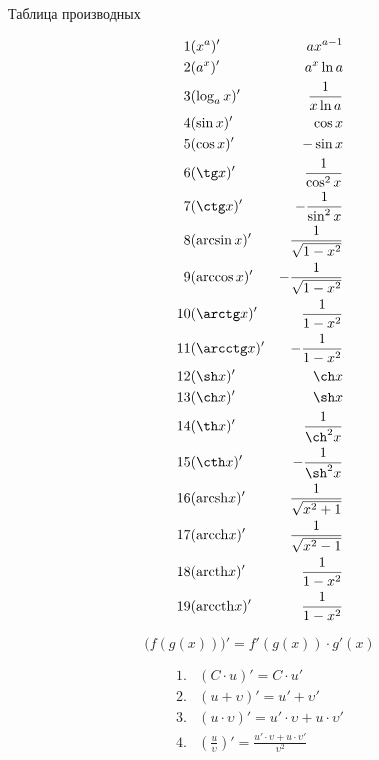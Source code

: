 \documentclass{article}
\newcommand{\arcsh}{\mathrm{arcsh}}
\newcommand{\arcch}{\mathrm{arcch}}
\newcommand{\arcth}{\mathrm{arcth}}
\newcommand{\arccth}{\mathrm{arccth}}
\begin{document}
{\large Таблица производных}

\begin{align*}
  1 &		(x^{a})'		    &	ax^{a-1}\\
  2 &		(a^{x})'		    &	a^{x}\ln a\\
  3 &		(\log_{a}x)'	  &	\frac{1}{x\ln a}\\
  4 &		(\sin x)'			  &	\cos x\\
  5 &		(\cos x)'		    &	-\sin x\\
  6 &		(\tg x)'			  &	\frac{1}{\cos^{2} x}\\
  7 & 	(\ctg x)'		    &	-\frac{1}{\sin^{2} x}\\
  8 &		(\arcsin x)'		&	\frac{1}{\sqrt{1-x^{2}}}\\
  9 &		(\arccos x)'		&	-\frac{1}{\sqrt{1-x^{2}}}\\
  10&	(\arctg x)'		    &	\frac{1}{1-x^{2}}\\
  11&	(\arcctg x)'		  &	-\frac{1}{1-x^{2}}\\
  12&	(\sh x)'			    &	\ch x\\
  13&	(\ch x)'			    &	\sh x\\
  14&	(\th x)' 			    &	\frac{1}{\ch^{2} x}\\
  15&	(\cth x)'		      &	-\frac{1}{\sh^{2} x}\\
  16&	(\arcsh x)'		    &	\frac{1}{\sqrt{x^{2}+1}}\\
  17&	(\arcch x)'		    &	\frac{1}{\sqrt{x^{2}-1}}\\
  18&	(\arcth x)'		    &	\frac{1}{1-x^{2}}\\
  19&	(\arccth x)'		  &	\frac{1}{1-x^{2}}\\
\end{align*}


\[   \Big(f(g(x))\Big) ' = f'(g(x)) \cdot g'(x)  \]


\begin{align*}
  1.&  (C\cdot u)'                         =   C\cdot u'\\
  2.&  \left(u + \upsilon       \right)'   =   u' + \upsilon'\\
  3.&  \left(u\cdot \upsilon    \right)'   =   u'\cdot\upsilon + u\cdot\upsilon' \\
  4.&  \left(\frac{u}{\upsilon} \right)'   =   \frac{u'\cdot\upsilon + u\cdot\upsilon'}{\upsilon^2}\\
\end{align*}
\end{document}
